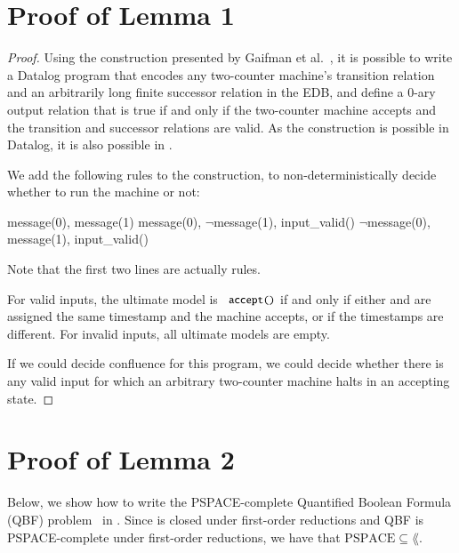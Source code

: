 \section{Proof of Lemma 1}
\begin{proof}

Using the construction presented by Gaifman et al.~\cite{undecidable-datalog}, it is possible to write a Datalog program that encodes any two-counter machine's transition relation and an arbitrarily long finite successor relation in the EDB, and define a 0-ary output relation  that is true if and only if the two-counter machine accepts and the transition and successor relations are valid.  As the construction is possible in Datalog, it is also possible in \lang.

We add the following rules to the construction, to non-deterministically decide whether to run the machine or not:

\begin{Drules}
        {message(0), message(1)}
        {message(0), $\lnot$message(1), input_valid()}
        {$\lnot$message(0), message(1), input_valid()}
\end{Drules}

Note that the first two lines are actually rules.  %


For valid inputs, the ultimate model is ${\dedalus{accept()}}$ if and only if either  and  are assigned the same timestamp and the machine accepts, or if the timestamps are different.  For invalid inputs, all ultimate models are empty.

If we could decide confluence for this program, we could decide whether there is any valid input for which an arbitrary two-counter machine halts in an accepting state.
\end{proof}


\section{Proof of Lemma 2}
Below, we show how to write the PSPACE-complete Quantified Boolean Formula (QBF) problem~\cite{garey-johnson} in \lang. Since \lang is closed under first-order reductions and QBF is PSPACE-complete under first-order reductions, we have that $\text{PSPACE} \subseteq \lang$.

